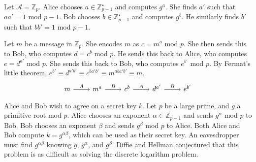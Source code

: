 \begin{example}
    Let $\mathcal A = \mathbb Z_p$.
    Alice chooses $a \in \mathbb Z_{p-1}^\star$ and computes $g^a$.
    She finds $a'$ such that $aa' = 1$ mod $p-1$.
    Bob chooses $b \in \mathbb Z_{p-1}^\star$ and computes $g^b$.
    He similarly finds $b'$ such that $bb' = 1$ mod $p-1$.

    Let $m$ be a message in $\mathbb Z_p$.
    She encodes $m$ as $c = m^a$ mod $p$.
    She then sends this to Bob, who computes $d = c^b$ mod $p$.
    He sends this back to Alice, who computes $e = d^{a'}$ mod $p$.
    She sends this back to Bob, who computes $e^{b'}$ mod $p$.
    By Fermat's little theorem, $e^{b'} \equiv d^{a'b'} \equiv c^{ba'b'} \equiv m^{aba'b'} \equiv m$.
    \[
        \begin{tikzcd}
            m & {m^a} & {c^b} & {d^{a'}} & {e^{b'}}
            \arrow["A", from=1-1, to=1-2]
            \arrow["B", from=1-2, to=1-3]
            \arrow["A", from=1-3, to=1-4]
            \arrow["B", from=1-4, to=1-5]
        \end{tikzcd}
    \]
\end{example}
\begin{example}
    Alice and Bob wish to agree on a secret key $k$.
    Let $p$ be a large prime, and $g$ a primitive root mod $p$.
    Alice chooses an exponent $\alpha \in \mathbb Z_{p-1}$ and sends $g^\alpha$ mod $p$ to Bob.
    Bob chooses an exponent $\beta$ and sends $g^\beta$ mod $p$ to Alice.
    Both Alice and Bob compute $k = g^{\alpha\beta}$, which can be used as their secret key.
    An eavesdropper must find $g^{\alpha\beta}$ knowing $g$, $g^{\alpha}$, and $g^{\beta}$.
    Diffie and Hellman conjectured that this problem is as difficult as solving the discrete logarithm problem.
\end{example}

